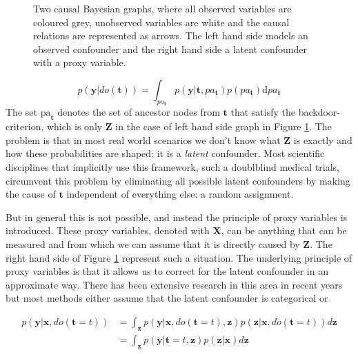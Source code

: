\documentclass{report}
\newcommand{\bt}{\mathbf{t}}
\newcommand{\bX}{\mathbf{X}}
\newcommand{\bx}{\mathbf{x}}
\newcommand{\by}{\mathbf{y}}
\newcommand{\bZ}{\mathbf{Z}}
\newcommand{\bz}{\mathbf{z}}
\begin{document}
\begin{figure}
    \centering
    
    \hspace{2cm}
    
    \caption{Two causal Bayesian graphs, where all observed variables are coloured grey, unobserved variables are white and the causal relations are represented as arrows. The left hand side models an observed confounder and the right hand side a latent confounder with a proxy variable.}
    \label{fig:graph_observed_confounder_and_latent_with_proxy}
\end{figure}


\begin{equation}\label{equation:do_operation}
   p(\by | do(\bt)) = \int_{pa_\bt} p(\by | \bt, pa_{\bt}) p(pa_{\bt}) \text{d} pa_\bt
\end{equation}
The set $\text{pa}_\bt$ denotes the set of ancestor nodes from $\bt$ that satisfy the backdoor-criterion\footnotemark[\ref{note:citation}], which is only $\bZ$ in the case of left hand side graph in Figure \ref{fig:graph_observed_confounder_and_latent_with_proxy}. The problem is that in most real world scenarios we don't know what $\bZ$ is exactly and how these probabilities are shaped: it is a \textit{latent} confounder\footnotemark[\ref{note:citation}]. Most scientific disciplines that implicitly use this framework, such a doublblind medical trials, circumvent this problem by eliminating all possible latent confounders by making the cause of $\bt$ independent of everything else: a random assignment.

But in general this is not possible, and instead the principle of proxy variables is introduced. These proxy variables, denoted with $\bX$, can be anything that can be measured and from which we can assume that it is directly caused by $\bZ$. The right hand side of Figure \ref{fig:graph_observed_confounder_and_latent_with_proxy} represent such a situation. The underlying principle of proxy variables is that it allows us to correct for the latent confounder in an approximate way. There has been extensive research in this area in recent years but most methods either assume that the latent confounder is categorical or 

\begin{equation}\label{equation:prediction_of_do_t}
    \begin{split}
        p(\by | \bx, do(\bt=t)) &= \int_{\bz} p(\by | \bx, do(\bt=t), \bz) p(\bz | \bx, do(\bt=t)) d\bz\\
        &= \int_{\bz} p(\by|\bt=t, \bz) p(\bz|\bx) d\bz
    \end{split}
\end{equation}
\end{document}
